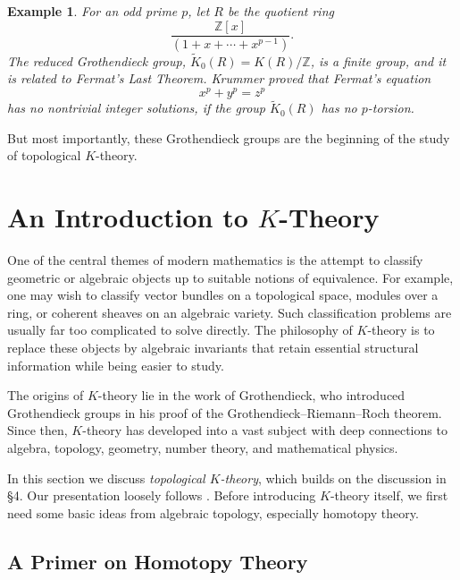 \documentclass[12pt,reqno]{amsart}
\theoremstyle{plain}
\newtheorem*{ex}{Example}
\numberwithin{equation}{section}
\begin{document}
\begin{ex}
    For an odd prime $p$, let $R$ be the quotient ring \[\frac{\mathbb Z[x]}{(1+x+\cdots + x^{p-1})}.\] The reduced Grothendieck group, $\widetilde{K}_0(R) =K(R)/\mathbb Z$, is a finite group, and it is related to Fermat's Last Theorem. Krummer proved that Fermat's equation \[x^p + y^p = z^p\] has no nontrivial integer solutions, if the group $\widetilde{K}_0(R)$ has no $p$-torsion.
\end{ex}    


\medskip
But most importantly, these Grothendieck groups are the beginning of the study of topological $K$-theory.














\section{An Introduction to $K$-Theory}

One of the central themes of modern mathematics is the attempt to classify geometric or algebraic objects up to suitable notions of equivalence. For example, one may wish to classify vector bundles on a topological space, modules over a ring, or coherent sheaves on an algebraic variety. Such classification problems are usually far too complicated to solve directly. The philosophy of $K$-theory is to replace these objects by algebraic invariants that retain essential structural information while being easier to study.

The origins of $K$-theory lie in the work of Grothendieck, who introduced Grothendieck groups in his proof of the Grothendieck--Riemann--Roch theorem. Since then, $K$-theory has developed into a vast subject with deep connections to algebra, topology, geometry, number theory, and mathematical physics.

In this section we discuss \emph{topological $K$-theory}, which builds on the discussion in \S 4. Our presentation loosely follows \cite{karoubi2006k}. Before introducing $K$-theory itself, we first need some basic ideas from algebraic topology, especially homotopy theory.

\subsection{A Primer on Homotopy Theory}
\end{document}
